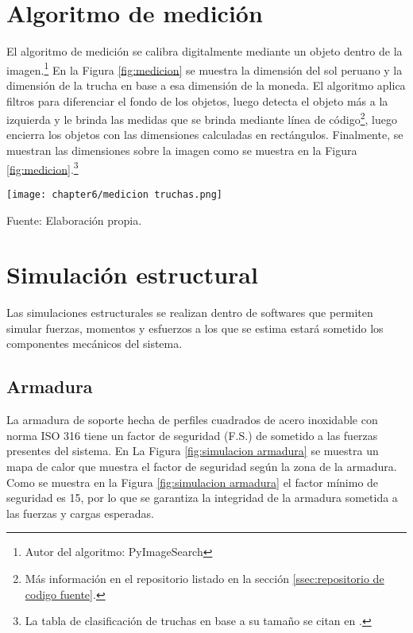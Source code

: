 \section{Algoritmo de medición}


El algoritmo de medición se calibra digitalmente mediante un objeto dentro de la imagen.\footnote{Autor del algoritmo: PyImageSearch} En la Figura \ref{fig:medicion} se muestra la dimensión del sol peruano y la dimensión de la trucha en base a esa dimensión de la moneda. El algoritmo aplica filtros para diferenciar el fondo de los objetos, luego detecta el objeto más a la izquierda y le brinda las medidas que se brinda mediante línea de código\footnote{Más información en el repositorio listado en la sección \ref{ssec:repositorio de codigo fuente}.}, luego encierra los objetos con las dimensiones calculadas en rectángulos. Finalmente, se muestran las dimensiones sobre la imagen como se muestra en la Figura \ref{fig:medicion}.\footnote{La tabla de clasificación de truchas en base a su tamaño se citan en \cite{DiazVergara2020}.}

\begin{myfigure}[H]
	\footnotesize\centering
	\texttt{[image: chapter6/medicion truchas.png]}
	\caption{Medición digital de una trucha referenciada dimensionalmente con una moneda de 1 sol peruano.}
	\begin{myflushcenter}
		Fuente: Elaboración propia.
	\end{myflushcenter}
	\label{fig:medicion}
\end{myfigure}

\section{Simulación estructural}

Las simulaciones estructurales se realizan dentro de softwares que permiten simular fuerzas, momentos y esfuerzos a los que se estima estará sometido los componentes mecánicos del sistema.

\subsection{Armadura}

La armadura de soporte hecha de perfiles cuadrados de acero inoxidable con norma ISO 316 tiene un factor de seguridad (F.S.) de sometido a las fuerzas presentes del sistema. En La Figura \ref{fig:simulacion armadura} se muestra un mapa de calor que muestra el factor de seguridad según la zona de la armadura. Como se muestra en la Figura  \ref{fig:simulacion armadura} el factor mínimo de seguridad es 15, por lo que se garantiza la integridad de la armadura sometida a las fuerzas y cargas esperadas.

